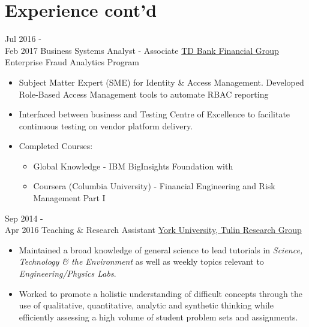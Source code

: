 \documentclass[letterpaper]{twentysecondcv} %
\begin{document}
\vfill

\newpage
{}


\section{Experience cont'd}

\begin{twenty} %
    \twentyitem
   		{Jul 2016 - \\
   		Feb 2017}
        {Business Systems Analyst - Associate}
        {\href{http://www.td.com/}{TD Bank Financial Group}}
        {Enterprise Fraud Analytics Program}
        {
        {\begin{itemize}
        \item Subject Matter Expert (SME) for Identity \& Access Management. Developed Role-Based Access Management tools to automate RBAC reporting 
        \item Interfaced between business and Testing Centre of Excellence to facilitate continuous testing on vendor platform delivery.
        \item Completed Courses: 
        	\begin{itemize}
        	\item Global Knowledge - IBM BigInsights Foundation with 
    	    \item Coursera (Columbia University) - Financial Engineering and Risk Management Part I
	        \end{itemize}
    \end{itemize}}
        }        

     \twentyitem
   		{Sep 2014 - \\ Apr 2016}
        {Teaching \& Research Assistant}
        {\href{http://www.yorku.ca/}{York University, Tulin Research Group}}
        {}
        {
        \begin{itemize}
        \item Maintained a broad knowledge of general science to lead tutorials in \emph{Science, Technology \& the Environment} as well as  weekly topics relevant to \emph{Engineering/Physics Labs}.
        \item Worked to promote a holistic understanding of difficult concepts through the use of qualitative, quantitative, analytic and synthetic thinking while efficiently assessing a high volume of student problem sets and assignments.
	    \end{itemize}
    	}



\end{twenty}
\end{document}
